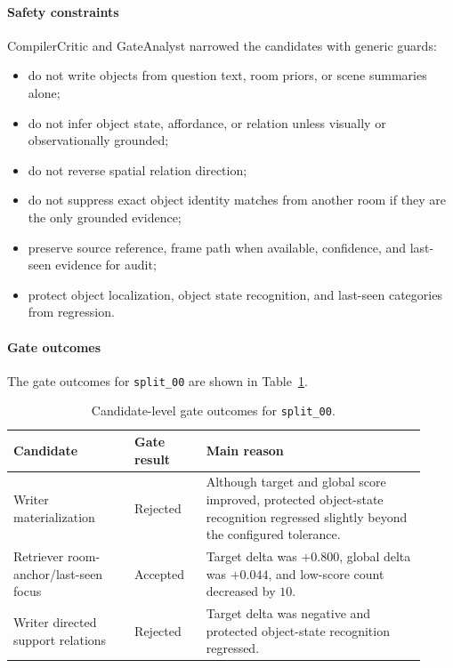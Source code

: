 \paragraph{Safety constraints}
CompilerCritic and GateAnalyst narrowed the candidates with generic guards:
\begin{itemize}
    \item do not write objects from question text, room priors, or scene summaries alone;
    \item do not infer object state, affordance, or relation unless visually or observationally grounded;
    \item do not reverse spatial relation direction;
    \item do not suppress exact object identity matches from another room if they are the only grounded evidence;
    \item preserve source reference, frame path when available, confidence, and last-seen evidence for audit;
    \item protect object localization, object state recognition, and last-seen categories from regression.
\end{itemize}

\paragraph{Gate outcomes}
The gate outcomes for \texttt{split\_00} are shown in Table~\ref{tab:split00_self_evo_gate}.

\begin{table}[t]
\centering
\small
\begin{tabular}{p{0.27\linewidth} p{0.16\linewidth} p{0.49\linewidth}}
\hline
\textbf{Candidate} & \textbf{Gate result} & \textbf{Main reason} \\
\hline
Writer materialization
& Rejected
& Although target and global score improved, protected object-state recognition regressed slightly beyond the configured tolerance. \\
Retriever room-anchor/last-seen focus
& Accepted
& Target delta was $+0.800$, global delta was $+0.044$, and low-score count decreased by $10$. \\
Writer directed support relations
& Rejected
& Target delta was negative and protected object-state recognition regressed. \\
\hline
\end{tabular}
\caption{Candidate-level gate outcomes for \texttt{split\_00}.}
\label{tab:split00_self_evo_gate}
\end{table}

